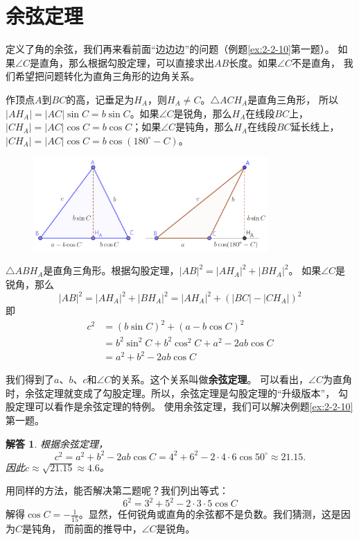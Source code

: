 \documentclass[12pt,UTF8]{ctexbook}
\newtheorem*{so}{解答}
\begin{document}
\section{余弦定理}

定义了角的余弦，我们再来看前面“边边边”的问题（例题\ref{ex:2-2-10}第一题）。
如果$\angle C$是直角，那么根据勾股定理，可以直接求出$AB$长度。如果$\angle C$不是直角，
我们希望把问题转化为直角三角形的边角关系。

作顶点$A$到$BC$的高，记垂足为$H_A$，则$H_A \neq C$。$\triangle ACH_A$是直角三角形，
所以$|AH_A| = |AC|\sin C = b\sin C$。如果$\angle C$是锐角，那么$H_A$在线段$BC$上，
$|CH_A| = |AC|\cos C = b\cos C$；如果$\angle C$是钝角，那么$H_A$在线段$BC$延长线上，
$|CH_A| = |AC|\cos C = b\cos (180^\circ - C)$。

\begin{figure}[H] %
    \vspace{4pt}
    \centering
    \includegraphics[width=0.8\textwidth]{tu/余弦定理1.png}
\end{figure}

$\triangle ABH_A$是直角三角形。根据勾股定理，$|AB|^2 = |AH_A|^2 + |BH_A|^2 $。
如果$\angle C$是锐角，那么
$$ |AB|^2 = |AH_A|^2 + |BH_A|^2 = |AH_A|^2 + (|BC| - |CH_A|)^2$$
即
\begin{align*}
    c^2 &= (b\sin C)^2 + (a - b\cos C)^2  \\
    &= b^2\sin^2 C + b^2\cos^2 C + a^2 - 2ab\cos C  \\
    &= a^2 + b^2 - 2ab\cos C 
\end{align*}

我们得到了$a$、$b$、$c$和$\angle C$的关系。这个关系叫做\textbf{余弦定理}。
可以看出，$\angle C$为直角时，余弦定理就变成了勾股定理。所以，余弦定理是勾股定理的“升级版本”，
勾股定理可以看作是余弦定理的特例。
使用余弦定理，我们可以解决例题\ref{ex:2-2-10}第一题。
\begin{so}
    根据余弦定理，
    $$c^2 = a^2 + b^2 - 2ab \cos C = 4^2 + 6^2 - 2\cdot 4\cdot 6 \cos 50^\circ \approx 21.15.$$
    因此$c \approx \sqrt{21.15} \approx 4.6$。
\end{so}
用同样的方法，能否解决第二题呢？我们列出等式：
$$6^2 = 3^2 + 5^2 - 2 \cdot 3\cdot 5 \cos C $$
解得$\cos C = -\frac{1}{15}$。显然，任何锐角或直角的余弦都不是负数。我们猜测，这是因为$C$是钝角，
而前面的推导中，$\angle C$是锐角。
\end{document}
